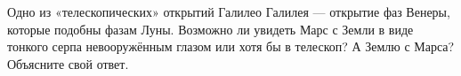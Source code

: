 Одно из «телескопических» открытий Галилео Галилея — открытие фаз Венеры,
которые подобны фазам Луны. Возможно ли увидеть Марс с Земли в виде тонкого
серпа невооружённым глазом или хотя бы в телескоп? А Землю с Марса?
Объясните свой ответ.
